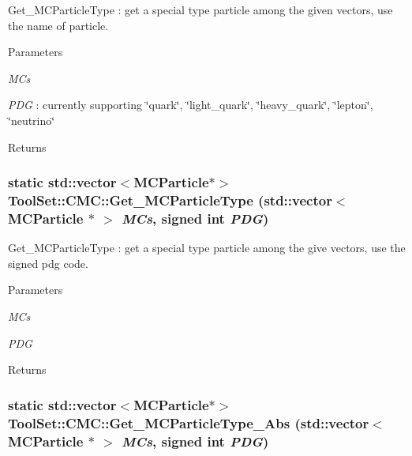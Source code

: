 Get\_\-MCParticleType : get a special type particle among the given vectors, use the name of particle. 
\begin{DoxyParams}{Parameters}
\item[{\em MCs}]\item[{\em PDG}]: currently supporting \char`\"{}quark\char`\"{}, \char`\"{}light\_\-quark\char`\"{}, \char`\"{}heavy\_\-quark\char`\"{}, \char`\"{}lepton\char`\"{}, \char`\"{}neutrino\char`\"{}\end{DoxyParams}
\begin{DoxyReturn}{Returns}

\end{DoxyReturn}
\hypertarget{classToolSet_1_1CMC_a0595ad7853b51cfc631547665a3cb63e}{
\subsubsection[{Get\_\-MCParticleType}]{\setlength{\rightskip}{0pt plus 5cm}static std::vector$<$MCParticle$\ast$$>$ ToolSet::CMC::Get\_\-MCParticleType (std::vector$<$ MCParticle $\ast$ $>$ {\em MCs}, \/  signed int {\em PDG})}}
\label{classToolSet_1_1CMC_a0595ad7853b51cfc631547665a3cb63e}


Get\_\-MCParticleType : get a special type particle among the give vectors, use the signed pdg code. 
\begin{DoxyParams}{Parameters}
\item[{\em MCs}]\item[{\em PDG}]\end{DoxyParams}
\begin{DoxyReturn}{Returns}

\end{DoxyReturn}
\hypertarget{classToolSet_1_1CMC_a8a83c548d4fa19b657194f055f5084db}{
\subsubsection[{Get\_\-MCParticleType\_\-Abs}]{\setlength{\rightskip}{0pt plus 5cm}static std::vector$<$MCParticle$\ast$$>$ ToolSet::CMC::Get\_\-MCParticleType\_\-Abs (std::vector$<$ MCParticle $\ast$ $>$ {\em MCs}, \/  signed int {\em PDG})}}
\label{classToolSet_1_1CMC_a8a83c548d4fa19b657194f055f5084db}


